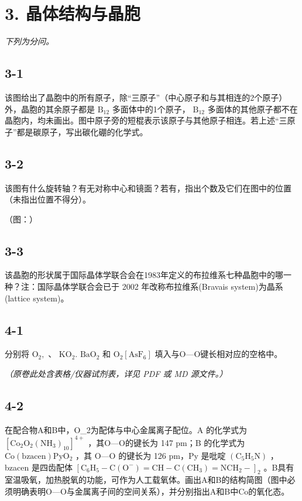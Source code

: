 \section*{3. 晶体结构与晶胞}
\textit{下列为分问。}

\subsection*{3-1}
该图给出了晶胞中的所有原⼦，除“三原⼦”（中⼼原⼦和与其相连的2个原⼦）外，晶胞的其余原⼦都是 $\mathrm { B _ { 1 2 } }$ 多⾯体中的1个原⼦， $\mathrm { B _ { 1 2 } }$ 多⾯体的其他原⼦都不在晶胞内，均未画出。图中原⼦旁的短棍表⽰该原⼦与其他原⼦相连。若上述“三原⼦”都是碳原⼦，写出碳化硼的化学式。

\subsection*{3-2}
该图有什么旋转轴？有⽆对称中⼼和镜⾯？若有，指出个数及它们在图中的位置（未指出位置不得分）。

（图：）

\subsection*{3-3}
该晶胞的形状属于国际晶体学联合会在1983年定义的布拉维系七种晶胞中的哪⼀种？注：国际晶体学联合会已于 2002 年改称布拉维系(Bravais system)为晶系(lattice system)。

\subsection*{4-1}
分别将 $\mathrm { O _ { 2 } } ,$ 、 $\mathrm { K O } _ { 2 } .$ $\mathrm { B a O _ { 2 } }$ 和 $\mathrm { O _ { 2 } [ A s F _ { 6 } ] }$ 填⼊与O—O键⻓相对应的空格中。

\textit{（原卷此处含表格/仪器试剂表，详见 PDF 或 MD 源文件。）}

\subsection*{4-2}
在配合物A和B中，O_{2}为配体与中⼼⾦属离⼦配位。A 的化学式为 $\mathrm { [ C o _ { 2 } O _ { 2 } ( N H _ { 3 } ) _ { 1 0 } ] ^ { 4 + } }$ ，其O—O的键⻓为 147 pm；B 的化学式为 $\mathrm { C o ( b z a c e n ) P y O _ { 2 } }$ ，其 O—O 的键⻓为 126 pm，Py 是吡啶 $\mathrm { ( C _ { 5 } H _ { 5 } N ) }$ ，bzacen 是四⻮配体 $[ \mathrm { C _ { 6 } H _ { 5 } - C ( O ^ { - } ) = C H - C ( C H _ { 3 } ) = N C H _ { 2 } - } ] _ { 2 }$ 。B具有室温吸氧，加热脱氧的功能，可作为⼈⼯载氧体。画出A和B的结构简图（图中必须明确表明O—O与⾦属离⼦间的空间关系），并分别指出A和B中Co的氧化态。
